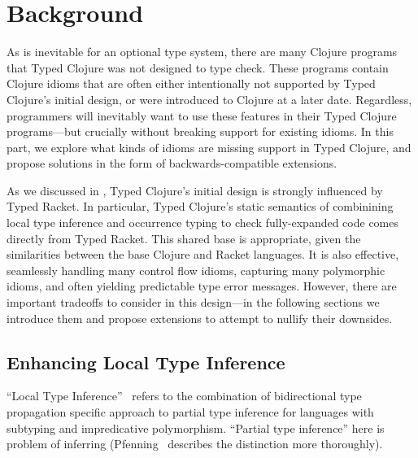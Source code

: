 \chapter{Background}

As is inevitable for an optional type system, there are many
Clojure programs that Typed Clojure was not designed to type check.
These programs contain Clojure idioms that are often either intentionally
not supported by Typed Clojure's initial design, or 
were introduced to Clojure at a later date.
Regardless, programmers will inevitably want to use these features 
in their Typed Clojure programs---but crucially without breaking
support for existing idioms.
In this part, we explore what kinds of idioms are missing
support in Typed Clojure, and propose solutions in the form of
backwards-compatible extensions.

As we discussed in , Typed Clojure's initial
design is strongly influenced by Typed Racket. In particular,
Typed Clojure's static semantics of
combinining local type inference and occurrence typing
to check fully-expanded code
comes directly from Typed Racket.
This shared base is appropriate, given the similarities between
the base Clojure and Racket languages.
It is also effective, seamlessly handling many control flow
idioms, capturing many polymorphic idioms, and often yielding
predictable type error messages.
However, there are important tradeoffs to consider in this design---in the following
sections we introduce them and propose extensions to attempt to nullify
their downsides.

\section{Enhancing Local Type Inference}

``Local Type Inference''~\cite{PierceLTI} refers to the combination of
bidirectional type propagation 
specific approach
to partial type inference for languages with subtyping and impredicative
polymorphism.
``Partial type inference'' here is
problem of inferring 
(Pfenning~\cite{Pfenning1988partial} describes the distinction more thoroughly).

